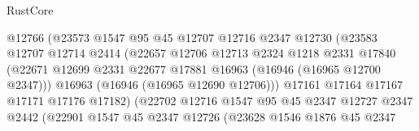 \begin{lexlean}{RustCore}
\begin{coremodule}
                                    @12766
                                    (@23573
                                      @1547
                                      @95
                                      @45
                                      @12707
                                      @12716
                                      @2347
                                      @12730
                                      (@23583
                                        @12707
                                        @12714
                                        @2414
                                        (@22657
                                          @12706
                                          @12713
                                          @2324
                                          @1218
                                          @2331
                                          @17840
                                          (@22671
                                            @12699
                                            @2331
                                            @22677
                                            @17881
                                            @16963
                                            (@16946 (@16965 @12700 @2347)))
                                          @16963
                                          (@16946 (@16965 @12690 @12706)))
                                        @17161
                                        @17164
                                        @17167
                                        @17171
                                        @17176
                                        @17182)
                                      (@22702
                                        @12716
                                        @1547
                                        @95
                                        @45
                                        @2347
                                        @12727
                                        @2347
                                        @2442
                                        (@22901
                                          @1547
                                          @45
                                          @2347
                                          @12726
                                          (@23628
                                            @1546
                                            @1876
                                            @45
                                            @2347

\end{coremodule}
\end{lexlean}
